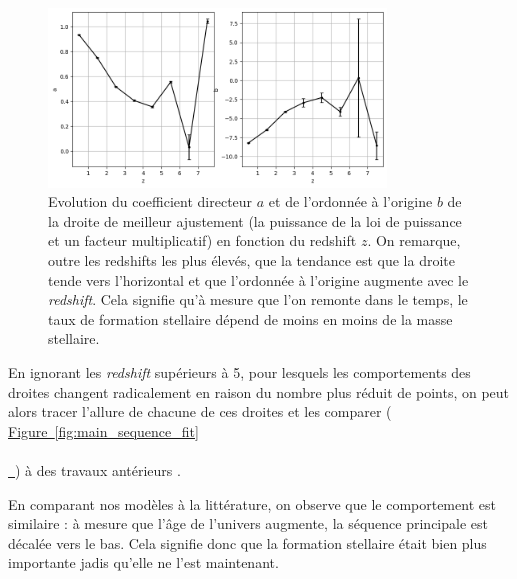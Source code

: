 \documentclass[12pt, a4paper]{article}
\newcommand*{\figref}[2][]{%
  \hyperref[{#2}]{%
    Figure~\ref*{#2}%
    \ifx\\#1\\%
    \else
      \,#1%
    \fi
  }%
}
\begin{document}
\begin{figure}[!h]
  \centering
  \includegraphics[width=0.8\textwidth]{assets/coeff_main_sequence.png}
  \caption{Evolution du coefficient directeur $a$ et de l'ordonnée à l'origine $b$ de la droite de meilleur ajustement (la puissance de la loi de puissance et un facteur multiplicatif) en fonction du redshift $z$. On remarque, outre les redshifts les plus élevés, que la tendance est que la droite tende vers l'horizontal et que l'ordonnée à l'origine augmente avec le \textit{redshift}. Cela signifie qu'à mesure que l'on remonte dans le temps, le taux de formation stellaire dépend de moins en moins de la masse stellaire.}
  \label{fig:coeff_main_sequence}
\end{figure}

En ignorant les \textit{redshift} supérieurs à 5, pour lesquels les comportements des droites changent radicalement en raison du nombre plus réduit de points, on peut alors tracer l'allure de chacune de ces droites et les comparer (\figref{fig:main_sequence_fit}) à des travaux antérieurs \parencite{10.1093_mnras_stac3214}.

En comparant nos modèles à la littérature, on observe que le comportement est similaire : à mesure que l'âge de l'univers augmente, la séquence principale est décalée vers le bas. Cela signifie donc que la formation stellaire était bien plus importante jadis qu'elle ne l'est maintenant.\\
\end{document}
